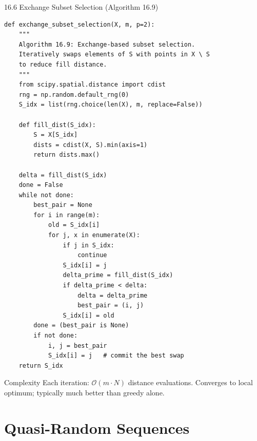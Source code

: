 \documentclass[aspectratio=169,10pt]{beamer}
\begin{document}
\begin{frame}[fragile]{16.6 Exchange Subset Selection (Algorithm 16.9)}
  \begin{lstlisting}[style=python, caption={Exchange subset selection (local search)}]
def exchange_subset_selection(X, m, p=2):
    """
    Algorithm 16.9: Exchange-based subset selection.
    Iteratively swaps elements of S with points in X \ S
    to reduce fill distance.
    """
    from scipy.spatial.distance import cdist
    rng = np.random.default_rng(0)
    S_idx = list(rng.choice(len(X), m, replace=False))

    def fill_dist(S_idx):
        S = X[S_idx]
        dists = cdist(X, S).min(axis=1)
        return dists.max()

    delta = fill_dist(S_idx)
    done = False
    while not done:
        best_pair = None
        for i in range(m):
            old = S_idx[i]
            for j, x in enumerate(X):
                if j in S_idx:
                    continue
                S_idx[i] = j
                delta_prime = fill_dist(S_idx)
                if delta_prime < delta:
                    delta = delta_prime
                    best_pair = (i, j)
                S_idx[i] = old
        done = (best_pair is None)
        if not done:
            i, j = best_pair
            S_idx[i] = j   # commit the best swap
    return S_idx
  \end{lstlisting}
  \begin{exampleblock}{Complexity}
    Each iteration: $\mathcal{O}(m \cdot N)$ distance evaluations.
    Converges to local optimum; typically much better than greedy alone.
  \end{exampleblock}
\end{frame}

\section{Quasi-Random Sequences}
\end{document}
